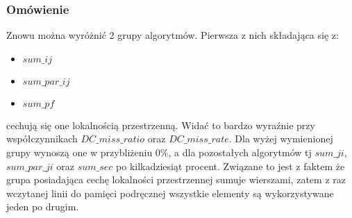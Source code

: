 \subsubsection{Omówienie}

Znowu można wyróżnić 2 grupy algorytmów. Pierwsza z nich składająca się z:

\begin{itemize}
\item $sum\_ij$
\item $sum\_par\_ij$
\item $sum\_pf$
\end{itemize}

cechują się one lokalnością przestrzenną. Widać to bardzo wyraźnie przy współczynnikach $DC\_miss\_ratio$ oraz $DC\_miss\_rate$. Dla wyżej wymienionej grupy wynoszą one w przybliżeniu $0\%$, a dla pozostałych algorytmów tj $sum\_ji$, $sum\_par\_ji$ oraz $sum\_sec$ po kilkadziesiąt procent. Związane to jest z faktem że grupa posiadająca cechę lokalności przestrzennej sumuje wierszami, zatem z raz wczytanej linii do pamięci podręcznej wszystkie elementy są wykorzystywane jeden po drugim.
